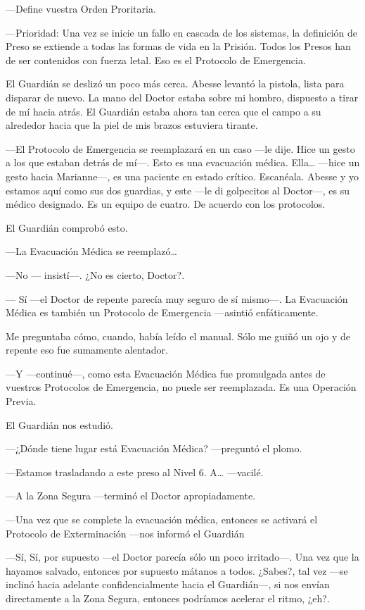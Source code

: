 ---Define vuestra Orden Proritaria.

---Prioridad: Una vez se inicie un fallo en cascada de los sistemas, la
definición de Preso se extiende a todas las formas de vida en la
Prisión. Todos los Presos han de ser contenidos con fuerza letal. Eso es
el Protocolo de Emergencia.

El Guardián se deslizó un poco más cerca. Abesse levantó la pistola,
lista para disparar de nuevo. La mano del Doctor estaba sobre mi hombro,
dispuesto a tirar de mí hacia atrás. El Guardián estaba ahora tan cerca
que el campo a su alrededor hacia que la piel de mis brazos estuviera
tirante.

---El Protocolo de Emergencia se reemplazará en un caso ---le dije. Hice
un gesto a los que estaban detrás de mí---. Esto es una evacuación
médica. Ella\ldots{} ---hice un gesto hacia Marianne---, es una paciente
en estado crítico. Escanéala. Abesse y yo estamos aquí como sus dos
guardias, y este ---le di golpecitos al Doctor---, es su médico
designado. Es un equipo de cuatro. De acuerdo con los protocolos.

El Guardián comprobó esto.

---La Evacuación Médica se reemplazó\ldots{}

---No --- insistí---. ¿No es cierto, Doctor?.

--- Sí ---el Doctor de repente parecía muy seguro de sí mismo---. La
Evacuación Médica es también un Protocolo de Emergencia ---asintió
enfáticamente.

Me preguntaba cómo, cuando, había leído el manual. Sólo me guiñó un ojo
y de repente eso fue sumamente alentador.

---Y ---continué---, como esta Evacuación Médica fue promulgada antes de
vuestros Protocolos de Emergencia, no puede ser reemplazada. Es una
Operación Previa.

El Guardián nos estudió.

---¿Dónde tiene lugar está Evacuación Médica? ---preguntó el plomo.

---Estamos trasladando a este preso al Nivel 6. A\ldots{} ---vacilé.

---A la Zona Segura ---terminó el Doctor apropiadamente.

---Una vez que se complete la evacuación médica, entonces se activará el
Protocolo de Exterminación ---nos informó el Guardián

---Sí, Sí, por supuesto ---el Doctor parecía sólo un poco irritado---.
Una vez que la hayamos salvado, entonces por supuesto mátanos a todos.
¿Sabes?, tal vez ---se inclinó hacia adelante confidencialmente hacia el
Guardián---, si nos envían directamente a la Zona Segura, entonces
podríamos acelerar el ritmo, ¿eh?.

